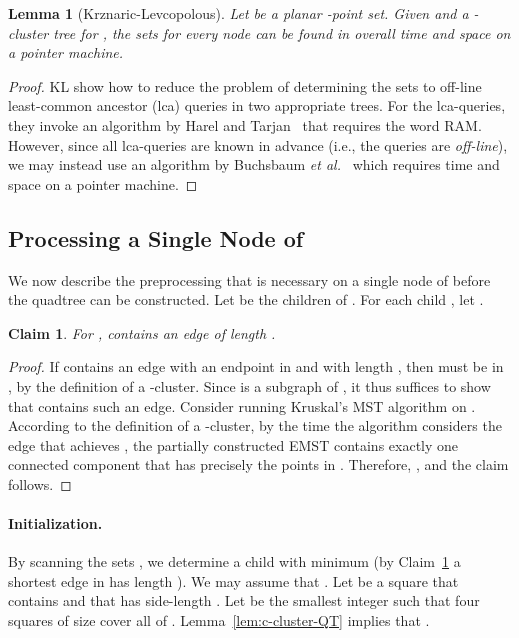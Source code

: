 \documentclass[11pt]{paper}
\newcommand {\etal} {\textit {et al.}}
\newtheorem {lem}[theorem] {Lemma}
\newtheorem {claim}[theorem] {Claim}
\begin{document}
\begin{lem}[Krznaric-Levcopolous]\label{lem:out}
Let  be a planar -point set.
Given  and a -cluster tree  for , the sets
\emph{} for every node  can be found in overall
 time and space on a pointer machine.
\end{lem}

\begin{proof}
KL show how to reduce the problem of determining the sets
 to  off-line least-common ancestor (lca) queries 
in two appropriate trees. For the lca-queries,
they invoke an algorithm by Harel and Tarjan~\cite{HarelTa84} that requires
the word RAM. However, since all lca-queries are known in
advance (i.e., the queries are \emph{off-line}), we  
may instead use an algorithm by
Buchsbaum \etal~\cite[Theorem~6.1]{BuchsbaumGeKaRoTaWe08} which 
requires  time and space on a pointer machine.
\end{proof}

\subsection{Processing a Single Node of }
\label{sec:one-node}
We now describe the preprocessing that is necessary on a single
node  of  before the quadtree  can be constructed.
Let 
be the children of . For each child , let
.

\begin{claim}\label{clm:delta_i}
For , \emph{} contains an edge of
length .
\end{claim}

\begin{proof}
If  contains an edge  with an endpoint in  and
with length , then  must
be in , by the definition of a -cluster.
Since  is a subgraph of , it thus suffices to show that
 contains such an edge.
Consider running Kruskal's MST algorithm on . According to the
definition of a -cluster, by the time the algorithm considers the edge 
that achieves , the partially constructed EMST contains exactly
one connected component that has precisely the points in .
Therefore, , and the claim follows.
\end{proof}

\paragraph{Initialization.}
By scanning the sets , we determine a child 
with minimum  (by Claim~\ref{clm:delta_i} a shortest edge in
 has length ).
We may assume that . Let  be a square that contains
 and that has side-length . Let  be
the smallest integer such
that four squares of size  cover all of .
Lemma~\ref {lem:c-cluster-QT} implies that .
\end{document}
